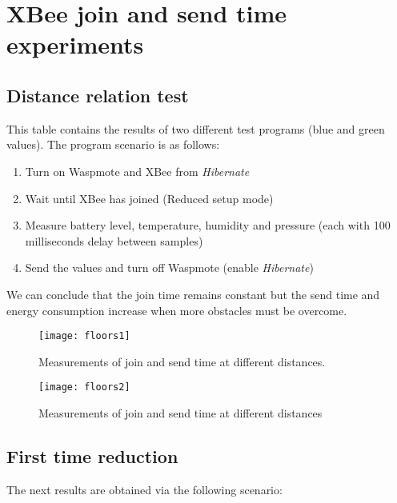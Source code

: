 \section{XBee join and send time experiments} %
\label{AppendixA} 
\subsection{Distance relation test}
This table contains the results of two different test programs (blue and green values). The program scenario is as follows:\\
\begin{enumerate}
\item Turn on Waspmote and XBee from \textit{Hibernate}
\item Wait until XBee has joined (Reduced setup mode)
\item Measure battery level, temperature, humidity and pressure (each with 100 milliseconds delay between samples)
\item Send the values and turn off Waspmote (enable \textit{Hibernate})
\vspace{1cm}
\end{enumerate} 
\vspace{1cm}
\noindent
We can conclude that the join time remains constant but the send time and energy consumption increase when more obstacles must be overcome.
\begin{figure}[htbp]
\centering
\texttt{[image: floors1]}
\caption[XBee join and send times: distance relation]{Measurements of join and send time at different distances.}
\label{fig:floors1}
\end{figure}
\begin{figure}[htbp]
\centering
\texttt{[image: floors2]}
\caption[XBee join and send times: distance relation]{Measurements of join and send time at different distances}
\label{fig:floors2}
\end{figure}

\pagebreak
\subsection{First time reduction}

The next results are obtained via the following scenario:\\

